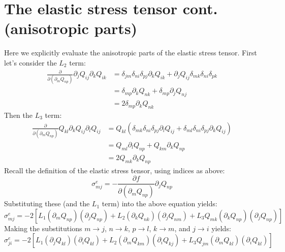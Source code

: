 \documentclass[reqno]{article}
\begin{document}
\section{The elastic stress tensor cont. (anisotropic parts)}
\label{section:anisotropic-stress-tensor}
Here we explicitly evaluate the anisotropic parts of the elastic stress tensor.
First let's consider the $L_2$ term:
\begin{equation}
\begin{split}
	\frac{\partial}{\partial \left( \partial_m Q_{np} \right)}
	\partial_j Q_{ij} \partial_k Q_{ik}
	&= \delta_{jm} \delta_{ni} \delta_{pj} \partial_k Q_{ik}
	+ \partial_j Q_{ij} \delta_{mk} \delta_{ni} \delta_{pk} \\
	&= \delta_{mp} \partial_k Q_{nk} + \delta_{mp} \partial_j  Q_{nj} \\
	&= 2 \delta_{mp} \partial_k Q_{nk}
\end{split}
\end{equation}
Then the $L_3$ term:
\begin{equation}
\begin{split}
	\frac{\partial}{\partial \left( \partial_m Q_{np} \right)}
	Q_{kl} \partial_k Q_{ij} \partial_l Q_{ij}
	&= Q_{kl} \left( \delta_{mk} \delta_{ni} \delta_{pj} \partial_l Q_{ij} + \delta_{ml} \delta_{ni} \delta_{pj} \partial_k Q_{ij} \right) \\
	&= Q_{ml} \partial_l Q_{np} + Q_{km} \partial_k Q_{np} \\
	&= 2 Q_{mk} \partial_k Q_{np}
\end{split}
\end{equation}
Recall the definition of the elastic stress tensor, using indices as above:
\begin{equation}
	\sigma^e_{mj}
	= - \frac{\partial f}{\partial \left(\partial_m Q_{np}\right)}
	\partial_j Q_{np}
\end{equation}
Substituting these (and the $L_1$ term) into the above equation yields:
\begin{equation}
	\sigma^e_{mj} 
	= -2 \left[
	L_1 \left( \partial_m Q_{np} \right) \left( \partial_j Q_{np} \right)
	+ L_2 \left( \partial_k Q_{nk} \right) \left( \partial_j Q_{nm} \right)
	+ L_3 Q_{mk} \left( \partial_k Q_{np} \right) \left( \partial_j Q_{np} \right)
	\right]
\end{equation}
Making the substitutions $m \to j$, $n \to k$, $p \to l$, $k \to m$, and $j \to i$ yields:
\begin{equation} \label{eq:full-stress-tensor}
	\sigma^e_{ji} = -2\left[
	L_1 \left( \partial_j Q_{kl} \right) \left( \partial_i Q_{kl} \right)
	+ L_2 \left( \partial_m Q_{km} \right) \left( \partial_i Q_{kj} \right)
	+ L_3 Q_{jm} \left( \partial_m Q_{kl} \right) \left( \partial_i Q_{kl} \right)
	\right]
\end{equation}
\end{document}
